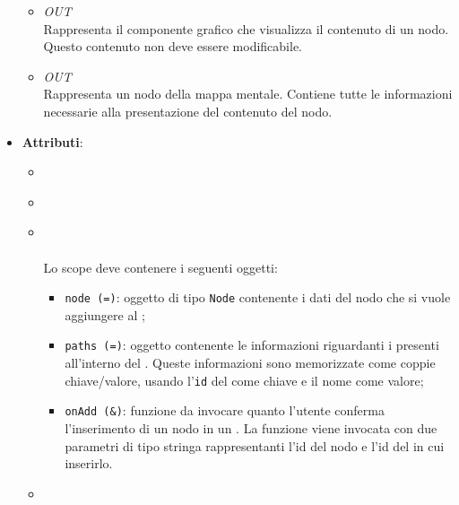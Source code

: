 \begin{itemize}
\begin{itemize}
\item \textit{OUT} \hyperref[\nogloxy{Premi::Front-End::Directives::premiNode}]{}\\
Rappresenta il componente grafico che visualizza il contenuto di un nodo. Questo contenuto non deve essere modificabile.
\item \textit{OUT} \hyperref[\nogloxy{Premi::Front-End::Model::Node}]{}\\
Rappresenta un nodo della mappa mentale. Contiene tutte le informazioni necessarie alla presentazione del contenuto del nodo.
\end{itemize}
\item \textbf{Attributi}:
\begin{itemize}
\item {}
\\ \dpDirectiveController
\item {}
\\ \dpRestrict
\item {}
\\ \dpIsolatedScope \\
Lo scope deve contenere i seguenti oggetti:
\begin{itemize}
\item \texttt{node (=)}: oggetto di tipo \texttt{Node} contenente i dati del nodo che si vuole aggiungere al ;
\item \texttt{paths (=)}: oggetto contenente le informazioni riguardanti i  presenti all'interno del . Queste informazioni sono memorizzate come coppie chiave/valore, usando l'\texttt{id} del  come chiave e il nome come valore;
\item \texttt{onAdd (\&)}: funzione da invocare quanto l’utente conferma l’inserimento di un nodo in un . La funzione viene invocata con due parametri di tipo stringa rappresentanti l’id del nodo e l’id del  in cui inserirlo.
\end{itemize}
\item {}
\\ \dpTemplateUrl
\end{itemize}
\end{itemize}
\label{\nogloxy{Premi::Front-End::Directives::premiAssociationAdder}}
